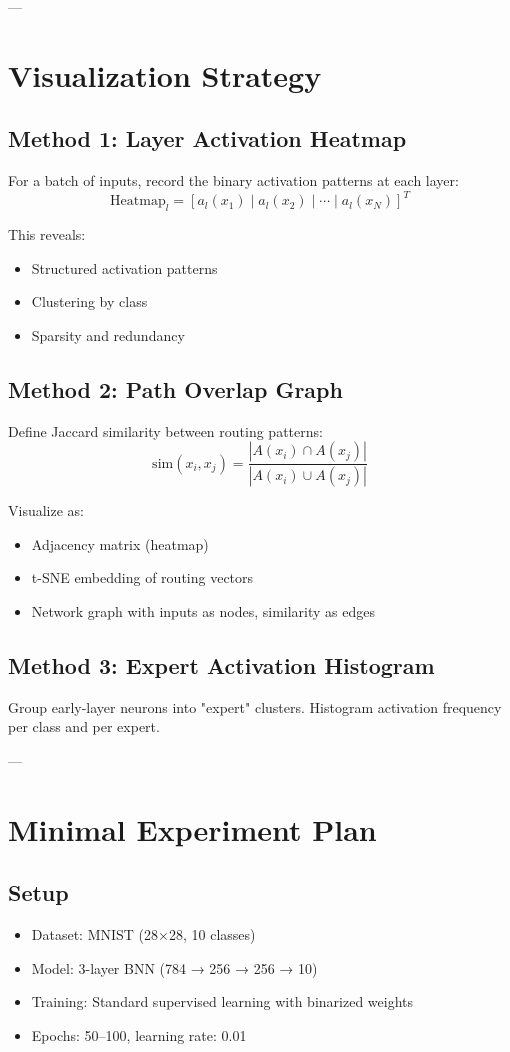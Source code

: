 ---

\section{Visualization Strategy}

\subsection{Method 1: Layer Activation Heatmap}
For a batch of inputs, record the binary activation patterns at each layer:
$$\text{Heatmap}_{l} = [a_l(x_1) \mid a_l(x_2) \mid \cdots \mid a_l(x_N)]^T$$

This reveals:
\begin{itemize}
  \item Structured activation patterns
  \item Clustering by class
  \item Sparsity and redundancy
\end{itemize}

\subsection{Method 2: Path Overlap Graph}
Define Jaccard similarity between routing patterns:
$$\text{sim}(x_i, x_j) = \frac{|A(x_i) \cap A(x_j)|}{|A(x_i) \cup A(x_j)|}$$

Visualize as:
\begin{itemize}
  \item Adjacency matrix (heatmap)
  \item t-SNE embedding of routing vectors
  \item Network graph with inputs as nodes, similarity as edges
\end{itemize}

\subsection{Method 3: Expert Activation Histogram}
Group early-layer neurons into "expert" clusters.
Histogram activation frequency per class and per expert.

---

\section{Minimal Experiment Plan}

\subsection{Setup}
\begin{itemize}
  \item Dataset: MNIST (28×28, 10 classes)
  \item Model: 3-layer BNN (784 → 256 → 256 → 10)
  \item Training: Standard supervised learning with binarized weights
  \item Epochs: 50–100, learning rate: 0.01
\end{itemize}

